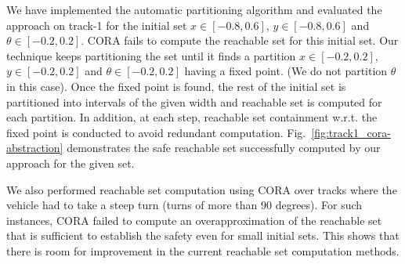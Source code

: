 We have implemented the automatic partitioning algorithm and evaluated the approach on track-1 for the initial set $x \in [-0.8, 0.6]$, $y \in [-0.8, 0.6]$ and $\theta \in [-0.2, 0.2]$. CORA fails to compute the reachable set for this initial set. 
%
Our technique keeps partitioning the set until it finds a  partition $x \in [-0.2, 0.2]$, $y \in [-0.2, 0.2]$ and $\theta \in [-0.2, 0.2]$ having a fixed point. (We do not partition $\theta$ in this case).
%
Once the fixed point is found, the rest of the initial set is partitioned into intervals of the given width and reachable set is computed for each partition. In addition, at each step, reachable set containment w.r.t. the fixed point is conducted to avoid redundant computation. Fig.~\ref{fig:track1_cora-abstraction} demonstrates the safe reachable set successfully computed by our approach  for the given set.


We also performed reachable set computation using CORA over tracks where the vehicle had to take a steep turn (turns of more than 90 degrees). For such instances, CORA failed to compute an overapproximation of the reachable set that is sufficient to establish the safety even for small initial sets. This shows that there is room for improvement in the current reachable set computation methods.



